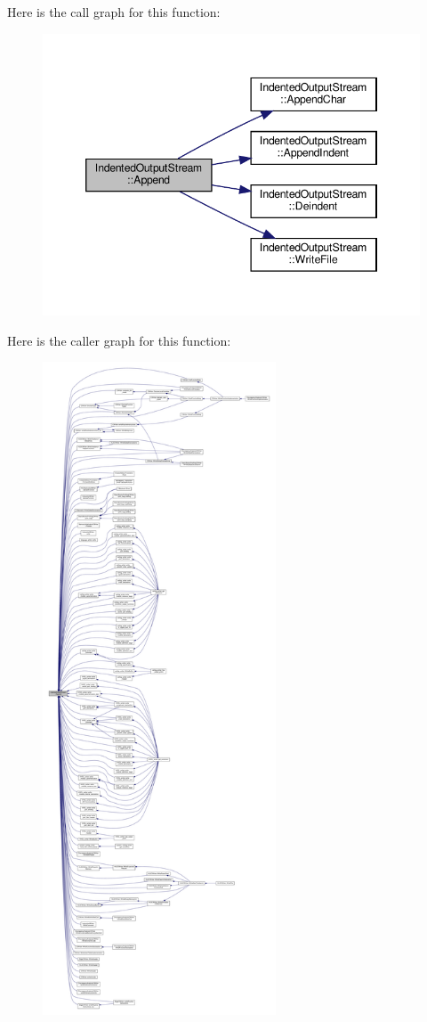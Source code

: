 Here is the call graph for this function\+:
\nopagebreak
\begin{figure}[H]
\begin{center}
\leavevmode
\includegraphics[width=346pt]{d4/d62/classIndentedOutputStream_ab9c200e93872397c9dd09bf8c2d8b651_cgraph}
\end{center}
\end{figure}
Here is the caller graph for this function\+:
\nopagebreak
\begin{figure}[H]
\begin{center}
\leavevmode
\includegraphics[height=550pt]{d4/d62/classIndentedOutputStream_ab9c200e93872397c9dd09bf8c2d8b651_icgraph}
\end{center}
\end{figure}
